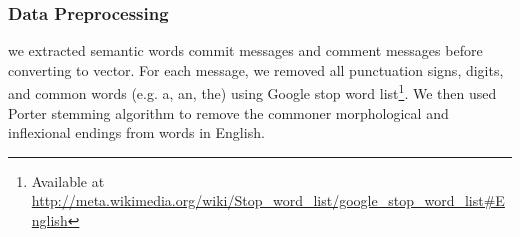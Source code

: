 



%
%
%



\subsubsection{Data Preprocessing}
 we extracted semantic words commit messages and comment messages before converting to vector. For each message, we removed all punctuation signs, digits, and common words (e.g. a, an, the) using Google stop word list\footnote{Available at \url{http://meta.wikimedia.org/wiki/Stop_word_list/google_stop_word_list#English}}. We then used Porter stemming algorithm to remove the commoner morphological and inflexional endings from words in English.
 


